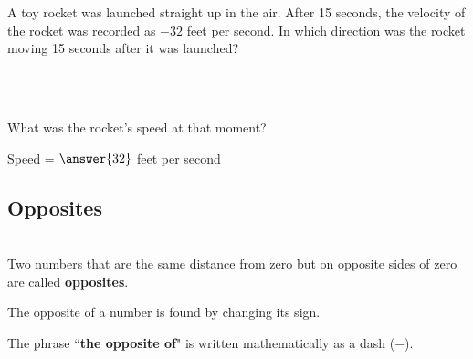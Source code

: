 \documentclass{ximera}[font=12pt]
\begin{document}
\begin{problem}
A toy rocket was launched straight up in the air.  After 15 seconds, the velocity of the rocket was recorded as $-32$ feet per second.
In which direction was the rocket moving 15 seconds after it was launched?

~ \\[2em]

\begin{multipleChoice}
\end{multipleChoice}

~ \\[2em]

What was the rocket's speed at that moment?

Speed = $\answer{32}$ feet per second

\end{problem}


\subsection*{Opposites}

\begin{definition}

~ \\[2em]

Two numbers that are the same distance from zero but on opposite sides
of zero are called \textbf{opposites}.

The opposite of a number is found by changing its sign.

The phrase ``\textbf{the opposite of}" is written mathematically as a dash ($-$).

\end{definition}
\end{document}
